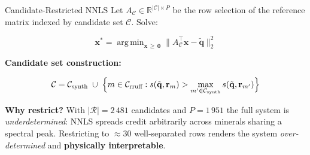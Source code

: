 \documentclass[aspectratio=169,10pt]{beamer}
\DeclareMathOperator*{\argmin}{arg\,min}
\begin{document}
\begin{frame}{Candidate-Restricted NNLS}
  Let $A_{\mathcal{C}}\in\mathbb{R}^{|\mathcal{C}|\times P}$ be the
  row selection of the reference matrix indexed by candidate set
  $\mathcal{C}$.  Solve:
  \begin{tcolorbox}[mathbox]
    \[
      \mathbf{x}^*
      =\argmin_{\mathbf{x}\,\ge\,\mathbf{0}}
        \bigl\lVert A_{\mathcal{C}}^\top\mathbf{x}
        -\tilde{\mathbf{q}}\bigr\rVert_2^2
    \]
  \end{tcolorbox}

  \vspace{0.15cm}
  \textbf{\color{headerbg}Candidate set construction:}

  \begin{tcolorbox}[mathbox]
    \[
      \mathcal{C}=\mathcal{C}_\text{synth}
      \;\cup\;
      \Bigl\{m\in\mathcal{C}_\text{rruff}
        :
        s(\tilde{\mathbf{q}},\mathbf{r}_m)
        >\max_{m'\in\mathcal{C}_\text{synth}}
         s(\tilde{\mathbf{q}},\mathbf{r}_{m'})
      \Bigr\}
    \]
  \end{tcolorbox}

  \vspace{0.15cm}
  \begin{tcolorbox}[whybox]
    \small\textbf{Why restrict?}\enspace
    With $|\mathcal{R}|=2\,481$ candidates and $P=1\,951$ the full system
    is \emph{underdetermined}: NNLS spreads credit arbitrarily across
    minerals sharing a spectral peak.
    Restricting to $\approx30$ well-separated rows renders the system
    \emph{over-determined} and \textbf{physically interpretable}.
  \end{tcolorbox}
\end{frame}
\end{document}
